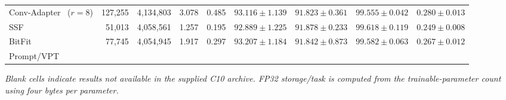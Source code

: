 \documentclass[pdflatex,sn-mathphys-num]{sn-jnl}
\theoremstyle{thmstyleone}
\theoremstyle{thmstyletwo}
\theoremstyle{thmstylethree}
\begin{document}
\begin{table}[!htbp]
{\begin{tabular}{@{}lrrrrrrrr@{}}
Conv-Adapter~\cite{chen2024convadapter} ($r=8$) & 127,255 & 4,134,803 & 3.078 & 0.485 & $93.116\pm1.139$ & $91.823\pm0.361$ & $99.555\pm0.042$ & $0.280\pm0.013$ \\
SSF~\cite{lian2022ssf} & 51,013 & 4,058,561 & 1.257 & 0.195 & $92.889\pm1.225$ & $91.878\pm0.233$ & $99.618\pm0.119$ & $0.249\pm0.008$ \\
BitFit~\cite{zaken2022bitfit} & 77,745 & 4,054,945 & 1.917 & 0.297 & $93.207\pm1.184$ & $91.842\pm0.873$ & $99.582\pm0.063$ & $0.267\pm0.012$ \\
Prompt/VPT~\cite{jia2022vpt} &  &  &  &  &  &  &  & \\
\bottomrule
\end{tabular}%
}
\vspace{2pt}
{\footnotesize\textit{Blank cells indicate results not available in the supplied C10 archive. FP32 storage/task is computed from the trainable-parameter count using four bytes per parameter.}}
\end{table}
\end{document}
